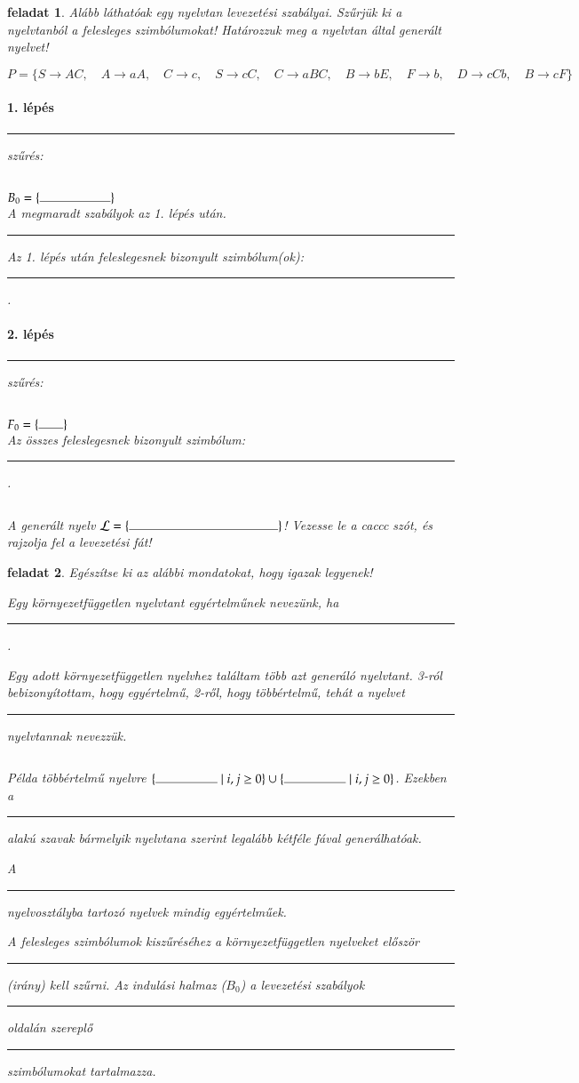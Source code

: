 \documentclass[a4paper]{article}
\newtheorem{feladat}{feladat}[section]
\newcommand{\spacer}[1][2 cm]{\rule{#1}{.4pt}\rule{0pt}{2em} }
\begin{document}
\begin{feladat}
Alább láthatóak egy nyelvtan levezetési szabályai. Szűrjük ki a
nyelvtanból a felesleges szimbólumokat!  Határozzuk meg a nyelvtan által
generált nyelvet!

\[P=\{ S \to AC,\quad A\to aA ,\quad C\to c,\quad S\to cC,\quad C\to
aBC,\quad
B\to bE,\quad F\to b,\quad D\to cCb,\quad B\to cF\}\]


\paragraph{1. lépés} \spacer szűrés:

$ B_0 = \{\spacer\}$\\[8.59em]

A megmaradt szabályok az 1. lépés után.

\spacer[.95\linewidth]

Az 1. lépés után feleslegesnek bizonyult szimbólum(ok): \spacer.

\paragraph{2. lépés} \spacer szűrés:

$ F_0 = \{\spacer[2em]\}$\\[9em]

Az összes feleslegesnek bizonyult szimbólum: \spacer.

A generált nyelv $\cal L = \{\spacer[12em]\}$! Vezesse le a caccc szót, és rajzolja fel a levezetési fát!

\vfill
\end{feladat}

\begin{feladat}%
Egészítse ki az alábbi mondatokat, hogy igazak legyenek!

Egy környezetfüggetlen nyelvtant egyértelműnek nevezünk, ha\\[1ex]
\spacer[.95\linewidth].

Egy adott környezetfüggetlen nyelvhez találtam több azt generáló
nyelvtant.  3-ról bebizonyítottam, hogy egyértelmű, 2-ről, hogy
többértelmű, tehát a nyelvet \spacer nyelvtannak nevezzük.

Példa többértelmű nyelvre $\{\spacer[5em] \mid i,j \ge
0\}\cup\{\spacer[5em] \mid i,j \ge 0\}$. Ezekben a \spacer alakú szavak
bármelyik nyelvtana szerint legalább kétféle fával generálhatóak.

A \spacer[5cm] nyelvosztályba tartozó nyelvek mindig egyértelműek.

A felesleges szimbólumok kiszűréséhez a környezetfüggetlen nyelveket
először \spacer[4cm] (irány) kell szűrni. Az indulási halmaz ($B_0$)
a levezetési szabályok \spacer{}oldalán szereplő%
\spacer[5cm] szimbólumokat tartalmazza.
\end{feladat}
\end{document}
